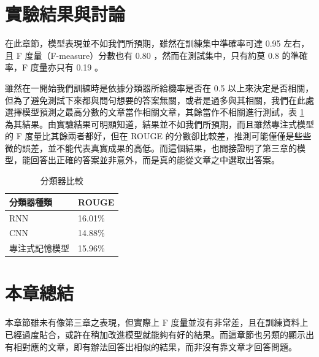 \section{實驗結果與討論}
在此章節，模型表現並不如我們所預期，雖然在訓練集中準確率可達 0.95 左右，且 F 度量（F-measure）分數也有 0.80 ，然而在測試集中，只有約莫 0.8 的準確率，F 度量亦只有 0.19 。

雖然在一開始我們訓練時是依據分類器所給機率是否在 0.5 以上來決定是否相關，但為了避免測試下來都與問句想要的答案無關，或者是過多與其相關，我們在此處選擇模型預測之最高分數的文章當作相關文章，其餘當作不相關進行測試，表 \ref{table:classifier} 為其結果。由實驗結果可明顯知道，結果並不如我們所預期，而且雖然專注式模型的 F 度量比其餘兩者都好，但在 ROUGE 的分數卻比較差，推測可能僅僅是些些微的誤差，並不能代表真實成果的高低。而這個結果，也間接證明了第三章的模型，能回答出正確的答案並非意外，而是真的能從文章之中選取出答案。
\begin{table}[ht]
    \caption{分類器比較} 
    \label{table:classifier}
    \centering
    \begin{tabular}{|l|l|}
        \hline
        分類器種類 & ROUGE\\
        \hline
        RNN & 16.01\%\\%
        \hline
        CNN & 14.88\%\\%
        \hline
        專注式記憶模型 & 15.96\%\\%
        \hline
    \end{tabular}
\end{table}
\section{本章總結}
本章節雖未有像第三章之表現，但實際上 F 度量並沒有非常差，且在訓練資料上已經過度貼合，或許在稍加改進模型就能夠有好的結果。而這章節也另類的顯示出有相對應的文章，即有辦法回答出相似的結果，而非沒有靠文章才回答問題。
